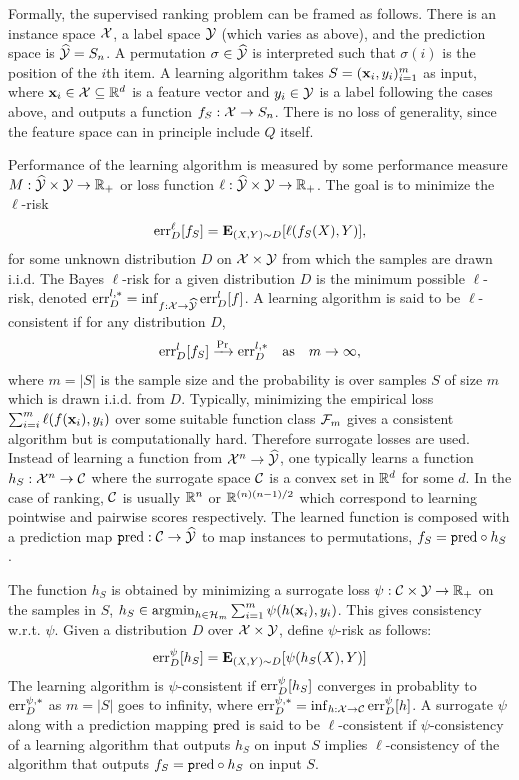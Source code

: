 Formally, the supervised ranking problem can be framed as follows. There is an
instance space ${\mathcal X}$, a label space ${\mathcal Y}$ (which varies as above), and the
prediction space is $\widehat{\mathcal{Y}} = S_n$. A permutation
$\sigma \in \widehat{\mathcal{Y}}$ is interpreted such that $\sigma(i)$ is the position of the
$i$th item. A learning algorithm
takes $S = ({\mathbf x}_i, y_i)_{i=1}^m$ as input,
where ${\mathbf x}_{i} \in {\mathcal X} \subseteq {\mathbb R}^d$ is a feature vector
and $y_i \in {\mathcal Y}$ is a label following the cases above,
and outputs a function
$f_S: {\mathcal X} \to S_n$.
There is no loss of generality, since the feature space can in principle 
include $Q$ itself.

Performance of the learning algorithm is measured by some performance measure
$M: \widehat{\mathcal{Y}} \times {\mathcal Y} \to {\mathbb R}_+$ or loss function
$\ell: \widehat{\mathcal{Y}} \times {\mathcal Y} \to {\mathbb R}_+$. The goal is to minimize the $\ell$-risk
\begin{align*}
  \text{err}_D^\ell[f_S] = {\mathbf E}_{({X}, Y) \sim D} [\ell(f_S({X}), Y)],
\end{align*}
for some unknown distribution $D$ on ${\mathcal X} \times {\mathcal Y}$ from which the samples
are drawn i.i.d.
The Bayes $\ell$-risk for a given distribution $D$ is the minimum possible
$\ell$-risk, denoted $\text{err}^{l,*}_D = \inf_{f:{\mathcal X} \to \widehat{\mathcal{Y}}} \text{err}^l_D[f]$.
A learning algorithm is said to be $\ell$-consistent if for any distribution $D$,
\begin{align*}
  \text{err}_D^l[f_S] \xrightarrow{\Pr} \text{err}_D^{l,*}
  \quad \text{as} \quad
  m \to \infty,
\end{align*}
where $m = |S|$ is the sample size and the probability is over samples $S$ of
size $m$ which is drawn i.i.d. from $D$. Typically, minimizing the empirical
loss $\sum_{i=i}^m \ell(f({\mathbf x}_i),y_i)$ over some suitable function class ${\mathcal F}_m$
gives a consistent algorithm but is computationally hard.
Therefore surrogate losses are used. Instead of learning a function from
${\mathcal X}^n \to \widehat{\mathcal{Y}}$, one typically learns a function $h_S: {\mathcal X}^n \to {\mathcal C}$ where the
surrogate space ${\mathcal C}$ is a convex set in ${\mathbb R}^d$ for some $d$. In the case of
ranking, ${\mathcal C}$ is usually ${\mathbb R}^n$ or ${\mathbb R}^{(n)(n-1)/2}$ which correspond to learning
pointwise and pairwise scores respectively.
The learned function is composed with a prediction map $\text{\texttt pred}: {\mathcal C} \to \widehat{\mathcal{Y}}$ to
map instances to permutations, $f_S = \text{\texttt pred} \circ h_S$.

The function $h_S$ is obtained by minimizing a surrogate loss
$\psi:{\mathcal C} \times {\mathcal Y} \to {\mathbb R}_+$ on the samples in $S$,
$h_S \in \textup{\textrm{argmin}}_{h\in{\mathcal H}_m}\sum_{i=1}^m \psi(h({\mathbf x}_i),y_i)$.
This gives consistency w.r.t. $\psi$. Given a distribution $D$ over
${\mathcal X} \times {\mathcal Y}$, define $\psi$-risk as follows:
$$\text{err}_D^\psi[h_S] = {\mathbf E}_{(X,Y)\sim D}[\psi(h_S(X),Y)]$$
The learning algorithm is $\psi$-consistent if $\text{err}_D^\psi[h_S]$
converges in probablity to $\text{err}_D^{\psi,*}$ as $m = |S|$ goes to infinity,
where $\text{err}_D^{\psi,*} = \inf_{h:{\mathcal X} \to {\mathcal C}}\text{err}_D^\psi[h]$.
A surrogate $\psi$ along with a prediction mapping $\text{\texttt pred}$ is said to be
$\ell$-consistent if $\psi$-consistency of a learning algorithm that
outputs $h_S$ on input $S$ implies $\ell$-consistency of the algorithm that
outputs $f_S = \text{\texttt pred} \circ h_S$ on input $S$.

